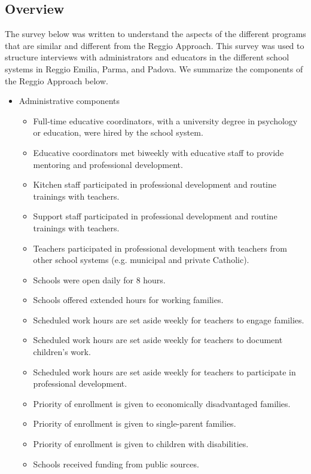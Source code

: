 \subsection{Overview}

The survey below was written to understand the aspects of the different programs that are similar and different from the Reggio Approach. This survey was used to structure interviews with administrators and educators in the different school systems in Reggio Emilia, Parma, and Padova. We summarize the components of the Reggio Approach below.

\begin{itemize}
\item Administrative components
\begin{itemize}
	\item Full-time educative coordinators, with a university degree in psychology or education, were hired by the school system.
	\item Educative coordinators met biweekly with educative staff to provide mentoring and professional development.
	\item Kitchen staff participated in professional development and routine trainings with teachers.
	\item Support staff participated in professional development and routine trainings with teachers.
	\item Teachers participated in professional development with teachers from other school systems (e.g. municipal and private Catholic).
	\item Schools were open daily for 8 hours.
	\item Schools offered extended hours for working families.
	\item Scheduled work hours are set aside weekly for teachers to engage families.
	\item Scheduled work hours are set aside weekly for teachers to document children's work.
	\item Scheduled work hours are set aside weekly for teachers to participate in professional development.
	\item Priority of enrollment is given to economically disadvantaged families.
	\item Priority of enrollment is given to single-parent families.
	\item Priority of enrollment is given to children with disabilities.
	\item Schools received funding from public sources. 
\end{itemize}

\end{itemize}
